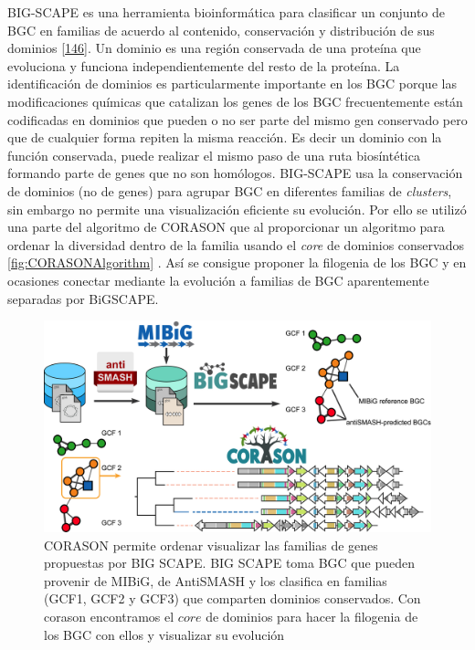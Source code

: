 \documentclass[12pt,twoside]{reedthesis}
\begin{document}
  BIG-SCAPE es una herramienta bioinformática para clasificar un conjunto
  de BGC en familias de acuerdo al contenido, conservación y distribución
  de sus dominios
  {[}\protect\hyperlink{ref-navarro-munoz_computational_2018}{146}{]}. Un
  dominio es una región conservada de una proteína que evoluciona y
  funciona independientemente del resto de la proteína. La identificación
  de dominios es particularmente importante en los BGC porque las
  modificaciones químicas que catalizan los genes de los BGC
  frecuentemente están codificadas en dominios que pueden o no ser parte
  del mismo gen conservado pero que de cualquier forma repiten la misma
  reacción. Es decir un dominio con la función conservada, puede realizar
  el mismo paso de una ruta biosíntética formando parte de genes que no
  son homólogos. BIG-SCAPE usa la conservación de dominios (no de genes)
  para agrupar BGC en diferentes familias de \emph{clusters}, sin embargo
  no permite una visualización eficiente su evolución. Por ello se utilizó
  una parte del algoritmo de CORASON que al proporcionar un algoritmo para
  ordenar la diversidad dentro de la familia usando el \emph{core} de
  dominios conservados \autoref{fig:CORASONAlgorithm} . Así se consigue
  proponer la filogenia de los BGC y en ocasiones conectar mediante la
  evolución a familias de BGC aparentemente separadas por BiGSCAPE.
  
  \begin{figure}[h!tbp]
  \centering
  \includegraphics[angle = 0,scale = .3]{chapter3/corason_fig1.png}
  \caption[Algoritmo de CORASON Algorithm]{\footnotesize{CORASON permite ordenar visualizar las familias de genes propuestas por BIG SCAPE. BIG SCAPE toma BGC que pueden provenir de MIBiG, de AntiSMASH y los clasifica en familias (GCF1, GCF2 y GCF3) que comparten dominios conservados. Con corason encontramos el $core$ de dominios para hacer la filogenia de los BGC con ellos y visualizar su evolución }}
  \label{fig:CORASONAlgorithm}
  \end{figure}
  
\end{document}
